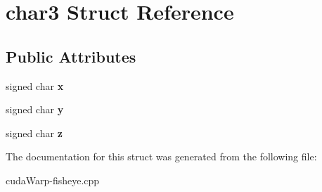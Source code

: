 \hypertarget{structchar3}{}\section{char3 Struct Reference}
\label{structchar3}
\subsection*{Public Attributes}
\begin{DoxyCompactItemize}
\item 
signed char {\bfseries x}\hypertarget{structchar3_a06f483ab03e1512e87eb2a48d6b68261}{}\label{structchar3_a06f483ab03e1512e87eb2a48d6b68261}

\item 
signed char {\bfseries y}\hypertarget{structchar3_a7b277086f782288da3aab6baf54e3604}{}\label{structchar3_a7b277086f782288da3aab6baf54e3604}

\item 
signed char {\bfseries z}\hypertarget{structchar3_ada473f255c617219aed043716e618d57}{}\label{structchar3_ada473f255c617219aed043716e618d57}

\end{DoxyCompactItemize}


The documentation for this struct was generated from the following file\+:\begin{DoxyCompactItemize}
\item 
cuda\+Warp-\/fisheye.\+cpp\end{DoxyCompactItemize}
